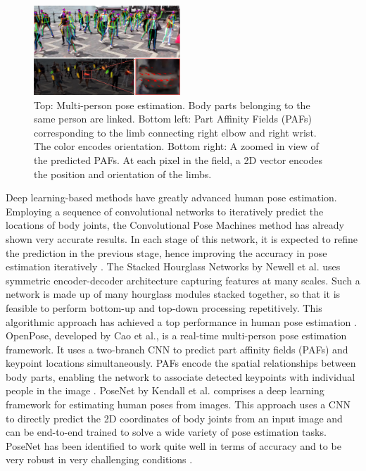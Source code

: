     \begin{figure}[htbp]
        \centering
        \includegraphics[width=0.49\textwidth]{figures/multipose.png}
        \caption{Top: Multi-person pose estimation. Body parts belonging to the same person are linked. Bottom left: Part Affinity Fields (PAFs) corresponding to the limb connecting right elbow and right wrist. The color encodes orientation. Bottom right: A zoomed in view of the predicted PAFs. At each pixel in the field, a 2D vector encodes the position and orientation of the limbs. \citep{cao2017realtime}}
        \label{fig:multipose}
    \end{figure}

    Deep learning-based methods have greatly advanced human pose estimation. Employing a sequence of convolutional networks to iteratively predict the locations of body joints, the Convolutional Pose Machines method has already shown very accurate results. In each stage of this network, it is expected to refine the prediction in the previous stage, hence improving the accuracy in pose estimation iteratively \citep{wei2016convolutional}. The Stacked Hourglass Networks by Newell et al. uses symmetric encoder-decoder architecture capturing features at many scales. Such a network is made up of many hourglass modules stacked together, so that it is feasible to perform bottom-up and top-down processing repetitively. This algorithmic approach has achieved a top performance in human pose estimation \citep{newell2016stacked}. OpenPose, developed by Cao et al., is a real-time multi-person pose estimation framework. It uses a two-branch CNN to predict part affinity fields (PAFs) and keypoint locations simultaneously. PAFs encode the spatial relationships between body parts, enabling the network to associate detected keypoints with individual people in the image \citep{cao2017realtime}. PoseNet by Kendall et al. comprises a deep learning framework for estimating human poses from images. This approach uses a CNN to directly predict the 2D coordinates of body joints from an input image and can be end-to-end trained to solve a wide variety of pose estimation tasks. PoseNet has been identified to work quite well in terms of accuracy and to be very robust in very challenging conditions \citep{kendall2015posenet}.\\

